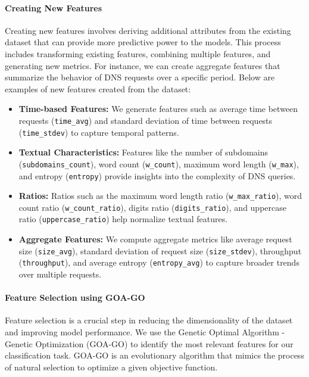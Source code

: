 \paragraph{Creating New Features}
Creating new features involves deriving additional attributes from the existing dataset that can provide more predictive power to the models. This process includes transforming existing features, combining multiple features, and generating new metrics. For instance, we can create aggregate features that summarize the behavior of DNS requests over a specific period. Below are examples of new features created from the dataset:

\begin{itemize}
    \item \textbf{Time-based Features:} We generate features such as average time between requests (\texttt{time\_avg}) and standard deviation of time between requests (\texttt{time\_stdev}) to capture temporal patterns.
    \item \textbf{Textual Characteristics:} Features like the number of subdomains (\texttt{subdomains\_count}), word count (\texttt{w\_count}), maximum word length (\texttt{w\_max}), and entropy (\texttt{entropy}) provide insights into the complexity of DNS queries.
    \item \textbf{Ratios:} Ratios such as the maximum word length ratio (\texttt{w\_max\_ratio}), word count ratio (\texttt{w\_count\_ratio}), digits ratio (\texttt{digits\_ratio}), and uppercase ratio (\texttt{uppercase\_ratio}) help normalize textual features.
    \item \textbf{Aggregate Features:} We compute aggregate metrics like average request size (\texttt{size\_avg}), standard deviation of request size (\texttt{size\_stdev}), throughput (\texttt{throughput}), and average entropy (\texttt{entropy\_avg}) to capture broader trends over multiple requests.
\end{itemize}




\paragraph{Feature Selection using GOA-GO}
Feature selection is a crucial step in reducing the dimensionality of the dataset and improving model performance. We use the Genetic Optimal Algorithm - Genetic Optimization (GOA-GO) to identify the most relevant features for our classification task. GOA-GO is an evolutionary algorithm that mimics the process of natural selection to optimize a given objective function.

